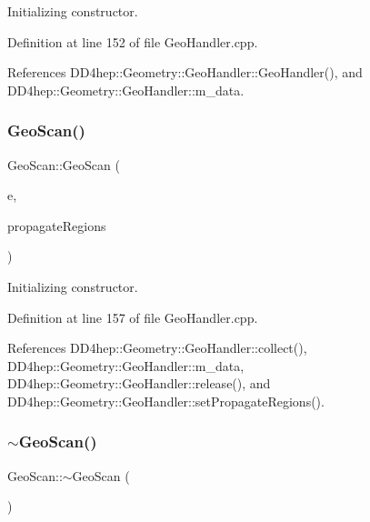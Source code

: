 Initializing constructor. 



Definition at line 152 of file Geo\+Handler.\+cpp.



References D\+D4hep\+::\+Geometry\+::\+Geo\+Handler\+::\+Geo\+Handler(), and D\+D4hep\+::\+Geometry\+::\+Geo\+Handler\+::m\+\_\+data.

\hypertarget{class_d_d4hep_1_1_geometry_1_1_geo_scan_a0bc62c86bafdf3a832f6f81a8fb68bd7}{}\label{class_d_d4hep_1_1_geometry_1_1_geo_scan_a0bc62c86bafdf3a832f6f81a8fb68bd7} 
\subsubsection{\texorpdfstring{Geo\+Scan()}{GeoScan()}\hspace{0.1cm}{\footnotesize\ttfamily [2/2]}}
{\footnotesize\ttfamily Geo\+Scan\+::\+Geo\+Scan (\begin{DoxyParamCaption}\item[{\hyperlink{class_d_d4hep_1_1_geometry_1_1_det_element}{Det\+Element}}]{e,  }\item[{bool}]{propagate\+Regions }\end{DoxyParamCaption})}



Initializing constructor. 



Definition at line 157 of file Geo\+Handler.\+cpp.



References D\+D4hep\+::\+Geometry\+::\+Geo\+Handler\+::collect(), D\+D4hep\+::\+Geometry\+::\+Geo\+Handler\+::m\+\_\+data, D\+D4hep\+::\+Geometry\+::\+Geo\+Handler\+::release(), and D\+D4hep\+::\+Geometry\+::\+Geo\+Handler\+::set\+Propagate\+Regions().

\hypertarget{class_d_d4hep_1_1_geometry_1_1_geo_scan_afc8fa45ac2fd4eee7b0a3a8d355ec218}{}\label{class_d_d4hep_1_1_geometry_1_1_geo_scan_afc8fa45ac2fd4eee7b0a3a8d355ec218} 
\subsubsection{\texorpdfstring{$\sim$\+Geo\+Scan()}{~GeoScan()}}
{\footnotesize\ttfamily Geo\+Scan\+::$\sim$\+Geo\+Scan (\begin{DoxyParamCaption}{ }\end{DoxyParamCaption})\hspace{0.3cm}{\ttfamily [virtual]}}



